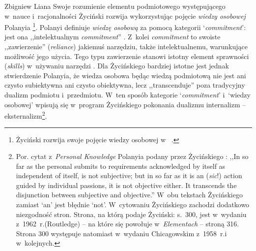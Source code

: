 \begin{artplenv}{Zbigniew Liana}
Swoje rozumienie elementu podmiotowego występującego w~nauce i~racjonalności Życiński rozwija wykorzystując pojęcie \textit{wiedzy osobowej} Polanyia
\parencite*[][]{polanyi_personal_1962}%
\footnote{Życiński rozwija swoje pojęcie wiedzy osobowej w~
\parencites[][s.~179–187]{zycinski_elementy_1996}[][s.~243–254]{zycinski_elementy_2015}.%
}. Polanyi definiuje \textit{wiedzę osobową} za pomocą kategorii ‘\textit{commitment}': jest ona ,,intelektualnym \textit{commitment}'' 
\parencite[][s.~IV]{polanyi_personal_1962}. %
 Z~kolei \textit{commitment} to swoiste ,,zawierzenie'' (\textit{reliance}) jakiemuś narzędziu, także intelektualnemu, warunkujące możliwość jego użycia. Tego typu zawierzenie stanowi istotny element sprawności (\textit{skills}) w~używaniu narzędzi 
\parencite[][s.~63]{polanyi_personal_1962}. %
 Dla Życińskiego bardziej istotne jest jednak stwierdzenie Polanyia, że wiedza osobowa będąc wiedzą podmiotową nie jest ani czysto subiektywna ani czysto obiektywna, lecz ,,transcenduje'' poza tradycyjny dualizm podmiotu i~przedmiotu. W~ten sposób kategorie ‘\textit{commitment}' i~‘wiedzy osobowej' wpisują się w~program Życińskiego pokonania dualizmu internalizm -- eksternalizm\footnote{Por. cytat z~\textit{Personal Knowledge} Polanyia podany przez Życińskiego 
\parencites[][s.~183, przypis 276]{zycinski_elementy_1996}[][s.~249, przypis 11]{zycinski_elementy_2015}: %
 ,,In so far as the personal submits to requirements acknowledged by itself as independent of itself, is not subjective; but in so far as it is an (\textit{sic}!) action guided by individual passions, it is not objective either. It transcends the disjunction between subjective and objective.'' W~obu tekstach Życińskiego zamiast ‘an' jest błędnie ‘not'. W~cytowaniu Życińskiego zachodzi dodatkowo niezgodność stron. Strona, na którą podaje Życiński: s.~300, jest w~wydaniu z~1962~r.(Routledge) -- na które się powołuje w~\textit{Elementach} -- stroną 316. Strona 300 występuje natomiast w~wydaniu Chicagowskim z~1958~r.i w~kolejnych.}.


\end{artplenv}
